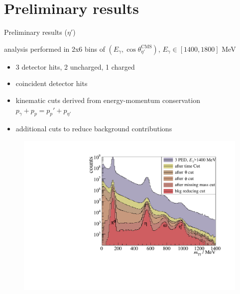\documentclass[11pt,aspectratio=169,dvipsnames]{beamer}
\newcommand{\thecolor}{black!70!blue}
\begin{document}
\section{Preliminary results}
\begin{frame}{Preliminary results ($\eta'$)}

\begin{tcolorbox}[colback=blue!5,colframe=\thecolor,title={Event selection ($\eta'$)}]
	\begin{minipage}{0.49\linewidth}
	analysis performed in 2x6 bins of $(E_\gamma,\cos\theta_{\eta'}^\text{CMS})$, $E_\gamma\in[1400,1800]$ MeV
	\begin{itemize}
		
		\item 3 detector hits, 2 uncharged, 1 charged
		\item coincident detector hits
		\item kinematic cuts derived from energy-momentum conservation $p_\gamma + p_p = p_p'+p_{\eta'}$
		\item additional cuts to reduce background contributions
	\end{itemize}
		\end{minipage}
	\begin{minipage}{.5\linewidth}
		\begin{figure}
			\centering
			\includegraphics[width=1.05\linewidth]{figs/inv_mass_pretty.pdf}
		\end{figure}
	\end{minipage}
\end{tcolorbox}



\end{frame}
\end{document}
